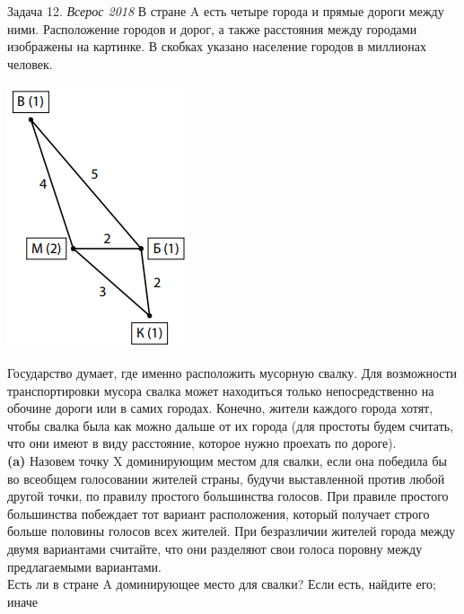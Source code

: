 \begin{mybox}{Задача 12. \textit{Всерос 2018}}
    \indent\setlength{\parindent}{1em}\indent\setlength{\parindent}{1em}В стране A есть четыре города и прямые дороги
    между ними. Расположение городов и дорог, а также расстояния между городами изображены на картинке. В скобках
    указано население городов в миллионах человек.
    \begin{center}
        \includegraphics[width=0.5\linewidth]{static/4_12}
    \end{center}
    \indent\setlength{\parindent}{1em}\indent\setlength{\parindent}{1em}Государство думает, где именно расположить
    мусорную свалку. Для возможности транспортировки мусора свалка может находиться только непосредственно на обочине
    дороги или в самих городах. Конечно, жители каждого города хотят, чтобы свалка была как можно дальше от их города
    (для простоты будем считать, что они имеют в виду расстояние, которое нужно проехать по дороге).\smallskip\\
    \indent\setlength{\parindent}{1em}\textbf{(a)} Назовем точку X доминирующим местом для свалки, если она победила
    бы во всеобщем голосовании жителей страны, будучи выставленной против любой другой точки, по правилу простого
    большинства голосов. При правиле простого большинства побеждает тот вариант расположения, который получает строго
    больше половины голосов всех жителей. При безразличии жителей города между двумя вариантами считайте, что они
    разделяют свои голоса поровну между предлагаемыми вариантами.\smallskip\\
    \indent\setlength{\parindent}{1em}Есть ли в стране A доминирующее место для свалки? Если есть, найдите его; иначе

\end{mybox}
